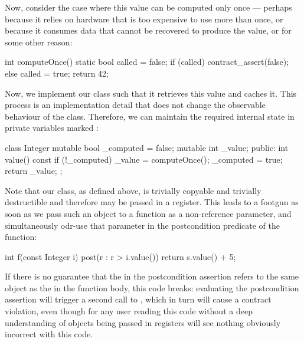 Now, consider the case where this value can be computed only once --- perhaps because it relies on hardware that is too expensive to use more than once, or because it consumes data that cannot be recovered to produce the value, or for some other reason:

\begin{codeblock}
int computeOnce()
{
  static bool called = false;
  if (called) {
    contract_assert(false);
  }
  else {
    called = true;
    return 42;
  }
}
\end{codeblock}

Now, we implement our  class such that it retrieves this value and caches it. This process is an implementation detail that does not change the observable behaviour of the class. Therefore, we can maintain the required internal state in private variables marked :
 \begin{codeblock}
class Integer {
  mutable bool _computed = false;
  mutable int  _value;
public:
  int value() const {
    if (!_computed) {
      _value = computeOnce();
      _computed = true;
    }
    return _value;
  }
};
 \end{codeblock}
 
Note that our  class, as defined above, is trivially copyable and trivially destructible and therefore may be passed in a register. This leads to a footgun as soon as we pass such an object to a function as a non-reference parameter, and simultaneously odr-use that parameter in the postcondition predicate of the function: 
 \begin{codeblock}
int f(const Integer i)
post(r : r > i.value()) {
  return s.value() + 5;
}
 \end{codeblock}
If there is no guarantee that the  in the postcondition assertion refers to the same object as the  in the function body, this code breaks: evaluating the postcondition assertion will trigger a second call to , which in turn will cause a contract violation, even though for any user reading this code without a deep understanding of objects being passed in registers will see nothing obviously incorrect with this code.


